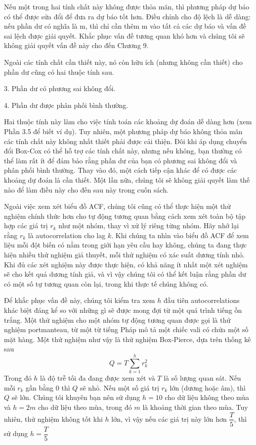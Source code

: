 \documentclass[12pt, a4paper,oneside]{book}
\theoremstyle{definition}
\begin{document}
Nếu một trong hai tính chất này không được thỏa mãn, thì phương pháp dự báo có thể được sửa đổi để đưa ra dự báo tốt hơn. Điều chỉnh cho độ lệch là dễ dàng: nếu phần dư có nghĩa là m, thì chỉ cần thêm m vào tất cả các dự báo và vấn đề sai lệch được giải quyết. Khắc phục vấn đề tương quan khó hơn và chúng tôi sẽ không giải quyết vấn đề này cho đến Chương 9.

Ngoài các tính chất cần thiết này, nó còn hữu ích (nhưng không cần thiết) cho phần dư cũng có hai thuộc tính sau.

3. Phần dư có phương sai không đổi.

4. Phần dư được phân phối bình thường.

Hai thuộc tính này làm cho việc tính toán các khoảng dự đoán dễ dàng hơn (xem Phần 3.5 để biết ví dụ). Tuy nhiên, một phương pháp dự báo không thỏa mãn các tính chất này không nhất thiết phải được cải thiện. Đôi khi áp dụng chuyển đổi Box-Cox có thể hỗ trợ các tính chất này, nhưng nếu không, bạn thường có thể làm rất ít để đảm bảo rằng phần dư của bạn có phương sai không đổi và phân phối bình thường. Thay vào đó, một cách tiếp cận khác để có được các khoảng dự đoán là cần thiết. Một lần nữa, chúng tôi sẽ không giải quyết làm thế nào để làm điều này cho đến sau này trong cuốn sách.

Ngoài việc xem xét biểu đồ ACF, chúng tôi cũng có thể thực hiện một thử nghiệm chính thức hơn cho tự động tương quan bằng cách xem xét toàn bộ tập hợp các giá trị $r_{k}$ như một nhóm, thay vì xử lý riêng từng nhóm. Hãy nhớ lại rằng $r_{k}$ là autocorrelation cho lag $k$. Khi chúng ta nhìn vào biểu đồ ACF để xem liệu mỗi đột biến có nằm trong giới hạn yêu cầu hay không, chúng ta đang thực hiện nhiều thử nghiệm giả thuyết, mỗi thử nghiệm có xác suất dương tính nhỏ. Khi đủ các xét nghiệm này được thực hiện, có khả năng ít nhất một xét nghiệm sẽ cho kết quả dương tính giả, và vì vậy chúng tôi có thể kết luận rằng phần dư có một số tự tương quan còn lại, trong khi thực tế chúng không có. 

Để khắc phục vấn đề này, chúng tôi kiểm tra xem $h$ đầu tiên autocorrelations khác biệt đáng kể so với những gì sẽ được mong đợi từ một quá trình tiếng ồn trắng. Một thử nghiệm cho một nhóm tự động tương quan được gọi là thử nghiệm portmanteau, từ một từ tiếng Pháp mô tả một chiếc vali có chứa một số mặt hàng.
Một thử nghiệm như vậy là thử nghiệm Box-Pierce, dựa trên thống kê sau $$Q=T\sum _ {k = 1 } ^ { h } r_{k}^{2}$$
Trong đó $h$ là độ trễ tối đa đang được xem xét và $T$ là số lượng quan sát. Nếu mỗi $r_{k}$ gần bằng $0$ thì $Q$ sẽ nhỏ. Nếu một số giá trị $r_{k}$ lớn (dương hoặc âm), thì $Q$ sẽ lớn. Chúng tôi khuyên bạn nên sử dụng $h = 10$ cho dữ liệu không theo mùa và $h = 2m$ cho dữ liệu theo mùa, trong đó $m$ là khoảng thời gian theo mùa. Tuy nhiên, thử nghiệm không tốt khi $h$ lớn, vì vậy nếu các giá trị này lớn hơn $\dfrac{T}{5}$, thì sử dụng $h = \dfrac{T}{5}$
\end{document}
